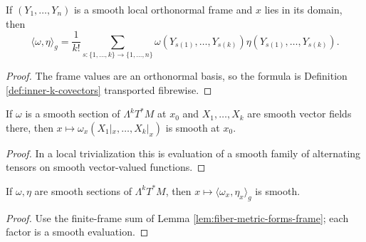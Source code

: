 \begin{lemma}
\label{lem:fiber-metric-forms-frame}





If $(Y_1,\ldots,Y_n)$ is a smooth local orthonormal frame and $x$ lies in its domain, then
\[
\langle\omega,\eta\rangle_g=\frac1{k!}\sum_{s:\{1,\ldots,k\}\to\{1,\ldots,n\}}\omega(Y_{s(1)},\ldots,Y_{s(k)})\eta(Y_{s(1)},\ldots,Y_{s(k)}).
\]
\end{lemma}
\begin{proof}

\sketch The frame values are an orthonormal basis, so the formula is Definition \ref{def:inner-k-covectors} transported fibrewise.
\end{proof}

\begin{lemma}
\label{lem:form-field-applied-to-vector-fields-smooth}




If $\omega$ is a smooth section of $\Lambda^kT^*M$ at $x_0$ and $X_1,\ldots,X_k$ are smooth vector fields there, then $x\mapsto\omega_x(X_1|_x,\ldots,X_k|_x)$ is smooth at $x_0$.
\end{lemma}
\begin{proof}

\sketch In a local trivialization this is evaluation of a smooth family of alternating tensors on smooth vector-valued functions.
\end{proof}

\begin{lemma}
\label{lem:fiber-metric-forms-smooth}





If $\omega,\eta$ are smooth sections of $\Lambda^kT^*M$, then $x\mapsto\langle\omega_x,\eta_x\rangle_g$ is smooth.
\end{lemma}
\begin{proof}

\sketch Use the finite-frame sum of Lemma \ref{lem:fiber-metric-forms-frame}; each factor is a smooth evaluation.
\end{proof}

